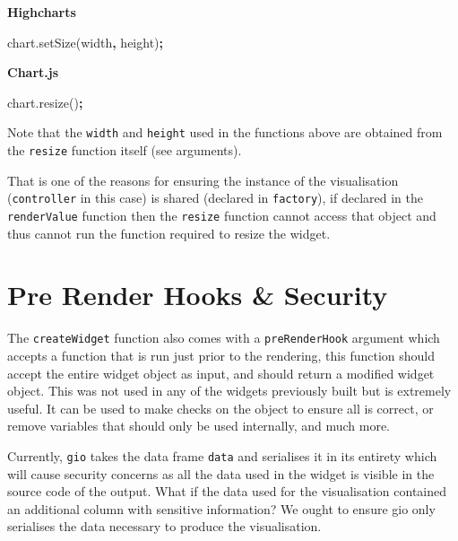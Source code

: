 \documentclass[
]{krantz}
\makeatletter
\newenvironment{Shaded}{\begin{snugshade}}{\end{snugshade}}
\newcommand{\AttributeTok}[1]{\textcolor[rgb]{0.61,0.61,0.61}{#1}}
\newcommand{\NormalTok}[1]{#1}
\newcommand{\OperatorTok}[1]{\textcolor[rgb]{0.43,0.43,0.43}{\textbf{#1}}}
\newcommand{\VariableTok}[1]{\textcolor[rgb]{0,0,0}{#1}}
\newenvironment{kframe}{%
\medskip{}
\setlength{\fboxsep}{.8em}
 \def\at@end@of@kframe{}%
 \ifinner\ifhmode%
  \def\at@end@of@kframe{\end{minipage}}%
  \begin{minipage}{\columnwidth}%
 \fi\fi%
 \def\FrameCommand##1{\hskip\@totalleftmargin \hskip-\fboxsep
 \colorbox{shadecolor}{##1}\hskip-\fboxsep
     \hskip-\linewidth \hskip-\@totalleftmargin \hskip\columnwidth}%
 \MakeFramed {\advance\hsize-\width
   \@totalleftmargin\z@ \linewidth\hsize
   \@setminipage}}%
 {\par\unskip\endMakeFramed%
 \at@end@of@kframe}
\renewenvironment{Shaded}{\begin{kframe}}{\end{kframe}}
\makeatother
\begin{document}
\textbf{Highcharts}

\begin{Shaded}
\begin{Highlighting}[]
\VariableTok{chart}\NormalTok{.}\AttributeTok{setSize}\NormalTok{(width}\OperatorTok{,}\NormalTok{ height)}\OperatorTok{;}
\end{Highlighting}
\end{Shaded}

\textbf{Chart.js}

\begin{Shaded}
\begin{Highlighting}[]
\VariableTok{chart}\NormalTok{.}\AttributeTok{resize}\NormalTok{()}\OperatorTok{;}
\end{Highlighting}
\end{Shaded}

Note that the \texttt{width} and \texttt{height} used in the functions above are obtained from the \texttt{resize} function itself (see arguments).

That is one of the reasons for ensuring the instance of the visualisation (\texttt{controller} in this case) is shared (declared in \texttt{factory}), if declared in the \texttt{renderValue} function then the \texttt{resize} function cannot access that object and thus cannot run the function required to resize the widget.

\hypertarget{pre-render-hooks-security}{%
\section{Pre Render Hooks \& Security}\label{pre-render-hooks-security}}

The \texttt{createWidget} function also comes with a \texttt{preRenderHook} argument which accepts a function that is run just prior to the rendering, this function should accept the entire widget object as input, and should return a modified widget object. This was not used in any of the widgets previously built but is extremely useful. It can be used to make checks on the object to ensure all is correct, or remove variables that should only be used internally, and much more.

Currently, \texttt{gio} takes the data frame \texttt{data} and serialises it in its entirety which will cause security concerns as all the data used in the widget is visible in the source code of the output. What if the data used for the visualisation contained an additional column with sensitive information? We ought to ensure gio only serialises the data necessary to produce the visualisation.
\end{document}
